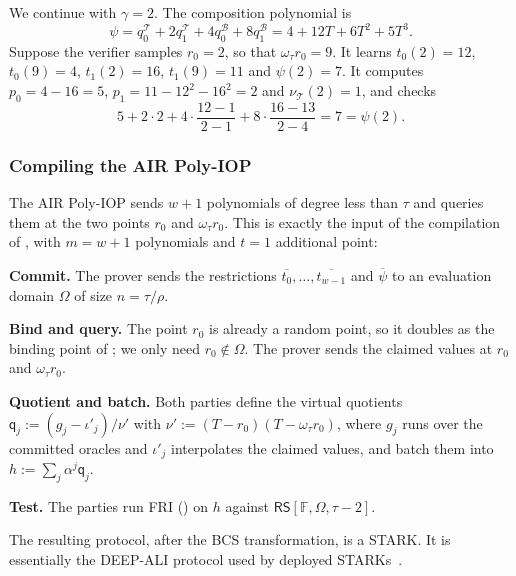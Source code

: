 \documentclass[../../book]{subfiles}
\begin{document}
\begin{example}\label{ex:stark-fibsq-5}
  We continue  with $\gamma = 2$.
  The composition polynomial is
  \begin{equation*}
    \psi = q^{\mathcal{T}}_0 + 2 q^{\mathcal{T}}_1 + 4 q^{\mathcal{B}}_0 + 8 q^{\mathcal{B}}_1 = 4 + 12T + 6T^2 + 5T^3.
  \end{equation*}
  Suppose the verifier samples $r_0 = 2$, so that $\omega_\tau r_0 = 9$.
  It learns $t_0(2) = 12$, $t_0(9) = 4$, $t_1(2) = 16$, $t_1(9) = 11$ and $\psi(2) = 7$.
  It computes $p_0 = 4 - 16 = 5$, $p_1 = 11 - 12^2 - 16^2 = 2$ and $\nu_{\mathcal{T}}(2) = 1$, and checks
  \begin{equation*}
    5 + 2 \cdot 2 + 4 \cdot \frac{12 - 1}{2 - 1} + 8 \cdot \frac{16 - 13}{2 - 4} = 7 = \psi(2).
  \end{equation*}
\end{example}

\subsubsection{Compiling the AIR Poly-IOP}

The AIR Poly-IOP sends $w + 1$ polynomials of degree less than $\tau$ and queries them at the two points $r_0$ and $\omega_\tau r_0$.
This is exactly the input of the compilation of , with $m = w + 1$ polynomials and $t = 1$ additional point:
\begin{algoen}
  \item \textbf{Commit.} The prover sends the restrictions $\overline{t_0}, \ldots, \overline{t_{w-1}}$ and $\overline{\psi}$ to an evaluation domain $\Omega$ of size $n = \tau / \rho$.
  \item \textbf{Bind and query.} The point $r_0$ is already a random point, so it doubles as the binding point of ; we only need $r_0 \notin \Omega$. The prover sends the claimed values at $r_0$ and $\omega_\tau r_0$.
  \item \textbf{Quotient and batch.} Both parties define the virtual quotients $\mathsf{q}_j := (g_j - \iota'_j)/\nu'$ with $\nu' := (T - r_0)(T - \omega_\tau r_0)$, where $g_j$ runs over the committed oracles and $\iota'_j$ interpolates the claimed values, and batch them into $h := \sum_j \alpha^j \mathsf{q}_j$.
  \item \textbf{Test.} The parties run FRI () on $h$ against $\mathsf{RS}[\mathbb{F}, \Omega, \tau - 2]$.
\end{algoen}
The resulting protocol, after the BCS transformation, is a STARK.
It is essentially the DEEP-ALI protocol used by deployed STARKs~\cite{ITCS:BGKS20}. %
\end{document}
